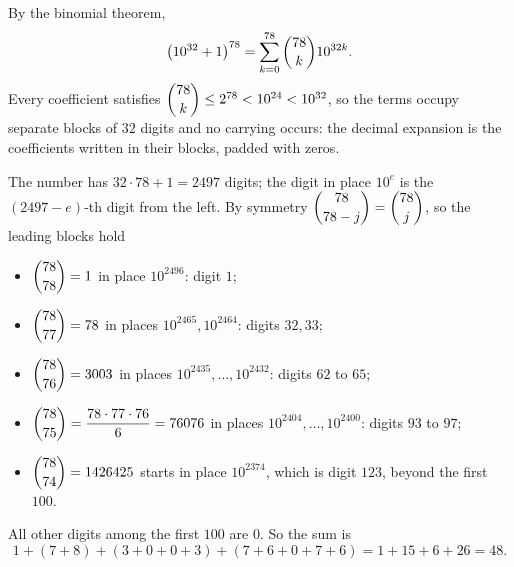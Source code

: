 By the binomial theorem,
\[\left(10^{32}+1\right)^{78}=\sum_{k=0}^{78}\dbinom{78}{k}10^{32k}.\]
Every coefficient satisfies $\dbinom{78}{k}\le2^{78}<10^{24}<10^{32}$, so the terms occupy separate blocks of $32$ digits and no carrying occurs: the decimal expansion is the coefficients written in their blocks, padded with zeros.

The number has $32\cdot78+1=2497$ digits; the digit in place $10^e$ is the $(2497-e)$-th digit from the left. By symmetry $\dbinom{78}{78-j}=\dbinom{78}{j}$, so the leading blocks hold
\begin{itemize}
\item $\dbinom{78}{78}=1$ in place $10^{2496}$: digit $1$;
\item $\dbinom{78}{77}=78$ in places $10^{2465},10^{2464}$: digits $32,33$;
\item $\dbinom{78}{76}=3003$ in places $10^{2435},\dots,10^{2432}$: digits $62$ to $65$;
\item $\dbinom{78}{75}=\dfrac{78\cdot77\cdot76}{6}=76076$ in places $10^{2404},\dots,10^{2400}$: digits $93$ to $97$;
\item $\dbinom{78}{74}=1426425$ starts in place $10^{2374}$, which is digit $123$, beyond the first $100$.
\end{itemize}
All other digits among the first $100$ are $0$. So the sum is
\[1+(7+8)+(3+0+0+3)+(7+6+0+7+6)=1+15+6+26=\boxed{48}.\]
